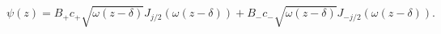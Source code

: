 \begin{equation} \label{phased-asymp}
\psi(z) = B_+ c_+\sqrt{\omega (z-\delta)} J_{j/2} (\omega (z-\delta)) + B_- c_-\sqrt{\omega (z-\delta)} J_{-j/2}(\omega (z-\delta)).
\end{equation}

